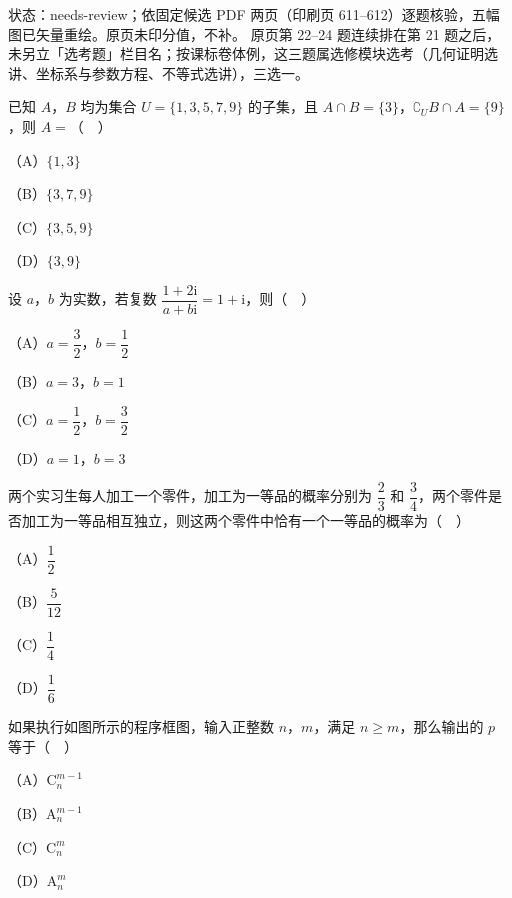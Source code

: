 状态：needs-review；依固定候选 PDF 两页（印刷页 611–612）逐题核验，五幅图已矢量重绘。原页未印分值，不补。
原页第 22–24 题连续排在第 21 题之后，未另立「选考题」栏目名；按课标卷体例，这三题属选修模块选考（几何证明选讲、坐标系与参数方程、不等式选讲），三选一。
\begin{question}
已知 $A$，$B$ 均为集合 $U=\{1,3,5,7,9\}$ 的子集，且 $A\cap B=\{3\}$，$\complement_U B\cap A=\{9\}$，则 $A=$（　）

（A）$\{1,3\}$

（B）$\{3,7,9\}$

（C）$\{3,5,9\}$

（D）$\{3,9\}$

\end{question}
\begin{question}
设 $a$，$b$ 为实数，若复数 $\dfrac{1+2\mathrm i}{a+b\mathrm i}=1+\mathrm i$，则（　）

（A）$a=\dfrac32$，$b=\dfrac12$

（B）$a=3$，$b=1$

（C）$a=\dfrac12$，$b=\dfrac32$

（D）$a=1$，$b=3$

\end{question}
\begin{question}
两个实习生每人加工一个零件，加工为一等品的概率分别为 $\dfrac23$ 和 $\dfrac34$，两个零件是否加工为一等品相互独立，则这两个零件中恰有一个一等品的概率为（　）

（A）$\dfrac12$

（B）$\dfrac{5}{12}$

（C）$\dfrac14$

（D）$\dfrac16$

\Needspace{0.4\textheight}
\end{question}
\begingroup
\renewenvironment{question}{\Needspace{0.5\textheight}}{}
\begin{question}
如果执行如图所示的程序框图，输入正整数 $n$，$m$，满足 $n\geqslant m$，那么输出的 $p$ 等于（　）

（A）$\mathrm C_n^{m-1}$

（B）$\mathrm A_n^{m-1}$

（C）$\mathrm C_n^{m}$

（D）$\mathrm A_n^{m}$
\nopagebreak[4]
\begin{center}\end{center}
\nopagebreak[4]
\end{question}
